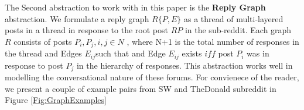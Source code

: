The Second abstraction to work with in this paper is the \textbf{Reply Graph} abstraction. We formulate a reply graph $R\{P,E\}$ as a thread of multi-layered posts in a thread in response to the root post $RP$ in the sub-reddit. Each graph $R$ consists of posts $P_i , P_j , i,j \in N$ , where N+1 is the total number of responses in the thread and Edges $E_{ij}$such that and Edge $E_{ij}$ exists $iff$ post $P_i$ was in response to post $P_j$ in the hierarchy of responses. This abstraction works well in modelling the conversational nature of these forums.  For convienece of the reader, we present a couple of example pairs from SW and TheDonald subreddit in Figure \ref{Fig:GraphExamples}
\begin{figure}[!ht]
	\centering



\end{figure}

